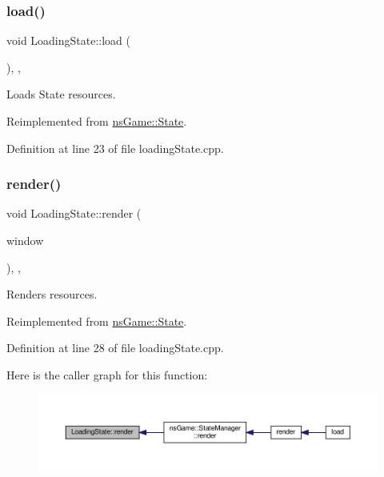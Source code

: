 \subsubsection{\texorpdfstring{load()}{load()}}
{\footnotesize\ttfamily void Loading\+State\+::load (\begin{DoxyParamCaption}{ }\end{DoxyParamCaption})\hspace{0.3cm}{\ttfamily [inline]}, {\ttfamily [override]}, {\ttfamily [virtual]}}



Loads State resources. 



Reimplemented from \hyperlink{structns_game_1_1_state_a8644de505f7a84933f6d6e6651205791}{ns\+Game\+::\+State}.



Definition at line 23 of file loading\+State.\+cpp.

\mbox{\label{class_loading_state_a64812e3f15d84b60ab8313509ba07520}} 
\subsubsection{\texorpdfstring{render()}{render()}}
{\footnotesize\ttfamily void Loading\+State\+::render (\begin{DoxyParamCaption}\item[{Min\+GL \&}]{window }\end{DoxyParamCaption})\hspace{0.3cm}{\ttfamily [inline]}, {\ttfamily [override]}, {\ttfamily [virtual]}}



Renders resources. 



Reimplemented from \hyperlink{structns_game_1_1_state_a214f8ee52de4b318f1ed3861a578ce67}{ns\+Game\+::\+State}.



Definition at line 28 of file loading\+State.\+cpp.

Here is the caller graph for this function\+:\nopagebreak
\begin{figure}[H]
\begin{center}
\leavevmode
\includegraphics[width=350pt]{class_loading_state_a64812e3f15d84b60ab8313509ba07520_icgraph}
\end{center}
\end{figure}
\mbox{\label{class_loading_state_a2c84aeaac65724696a6cacd6474119bf}} 
